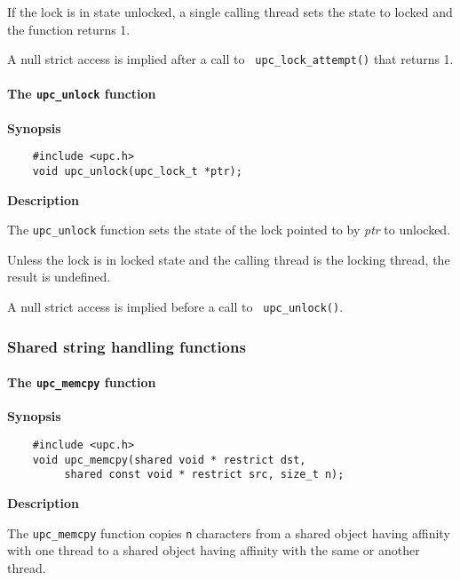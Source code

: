 \np If the lock is in state unlocked, a single calling thread
    sets the state to locked and the function returns 1.

\np A null strict access is implied after a call to {\tt
    upc\_lock\_attempt()} that returns 1.

\paragraph{The {\tt upc\_unlock} function}

{\bf Synopsis} 

\npf\vspace{-2.5em}
\begin{verbatim}
    #include <upc.h> 
    void upc_unlock(upc_lock_t *ptr); 
\end{verbatim}

{\bf Description}

\np The {\tt upc\_unlock} function sets the state of
   the lock pointed to by {\em ptr} to unlocked.

\np Unless the lock is in locked state and the calling
    thread is the locking thread, the result is undefined.

\np A null strict access is implied before a call to {\tt
    upc\_unlock()}.

\subsubsection{Shared string handling functions}

\paragraph{The {\tt upc\_memcpy} function}

{\bf Synopsis} 

\npf\vspace{-2.5em}
\begin{verbatim}
    #include <upc.h> 
    void upc_memcpy(shared void * restrict dst, 
         shared const void * restrict src, size_t n); 
\end{verbatim}

{\bf Description}

\np The {\tt upc\_memcpy} function copies {\tt n} characters
  from a shared object having affinity with one thread to a shared object
  having affinity with the same or another thread.

